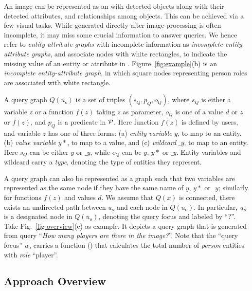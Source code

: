 An image can be represented as an  with detected objects along with their detected attributes, and relationships among objects. This can be achieved via a few visual tasks. While  generated directly after image processing is often incomplete, \ie it may miss some crucial information to answer queries. We hence refer to {\em entity-attribute graphs} with incomplete information as {\em incomplete entity-attribute graphs}, and associate nodes with white rectangles, to indicate the missing value of an entity or attribute in . Figure~\ref{fig:example}(b) is an {\em incomplete entity-attribute graph}, in which square nodes representing person roles are associated with white rectangle. 

  A query graph $Q(u_o)$ is a set of triples
$(s_Q, p_Q, o_Q)$, where $s_Q$ is either a variable $z$ or a function $f(z)$ taking $z$ as parameter, $o_Q$ is one of a value $d$ or $z$ or $f(z)$, and $p_Q$ is a predicate in ${\cal P}$. Here function $f(z)$ is defined by users, and variable $z$ has one
of three forms: (a) {\em entity variable} $y$, to map to an entity, (b)
{\em value variable} $y*$, to map to a value, and (c) {\em wildcard} $\_y$, to
map to an entity. Here $s_Q$ can be either $y$ or $\_y$, while $o_Q$ can
be $y$, $y*$ or $\_y$. Entity variables and wildcard carry a {\em type},
denoting the type of entities they represent. 

A query graph can also be represented as a graph such
that two variables are represented as the same node if they
have the same name of $y$, $y*$ or $\_y$; similarly for functions $f(z)$ and values $d$.
We assume \kwlog that $Q(x)$ is connected, \ie there exists
an undirected path between $u_o$ and each node in $Q(u_o)$.
In particular, $u_o$ is a designated node in $Q(u_o)$, denoting the query focus and labeled by ``?''. %
Take Fig.~\ref{fig-overview}(c) as example. It depicts a query graph that is generated from query ``{\em How many players are there in the image?}''. Note that the ``query focus'' $u_o$ carries a function () that calculates the total number of {\em person} entities with {\em role} ``player''. 


\subsection{Approach Overview}
\label{sec-architecture}



